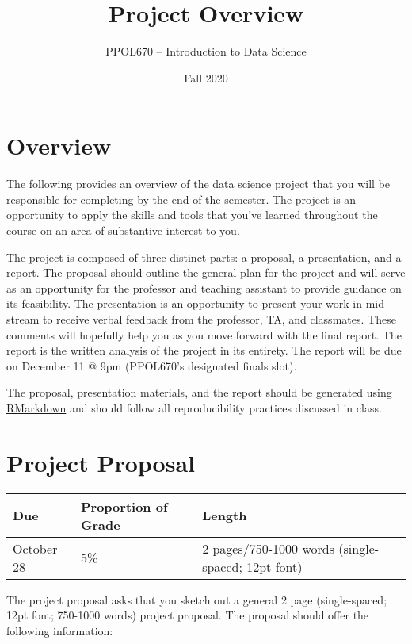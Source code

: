 \documentclass[
  12pt,
]{article}
\title{\textbf{Project Overview}}
\author{\Large PPOL670 -- Introduction to Data Science}
\date{Fall 2020}
\begin{document}
\maketitle

{
\setcounter{tocdepth}{3}
\tableofcontents
}
\hypertarget{overview}{%
\section{Overview}\label{overview}}

The following provides an overview of the data science project that you
will be responsible for completing by the end of the semester. The
project is an opportunity to apply the skills and tools that you've
learned throughout the course on an area of substantive interest to you.

The project is composed of three distinct parts: a proposal, a
presentation, and a report. The proposal should outline the general plan
for the project and will serve as an opportunity for the professor and
teaching assistant to provide guidance on its feasibility. The
presentation is an opportunity to present your work in mid-stream to
receive verbal feedback from the professor, TA, and classmates. These
comments will hopefully help you as you move forward with the final
report. The report is the written analysis of the project in its
entirety. The report will be due on December 11 @ 9pm (PPOL670's
designated finals slot).

The proposal, presentation materials, and the report should be generated
using
\href{https://rmarkdown.rstudio.com/authoring_quick_tour.html}{RMarkdown}
and should follow all reproducibility practices discussed in class.

\hypertarget{project-proposal}{%
\section{Project Proposal}\label{project-proposal}}

\begin{longtable}[]{@{}lll@{}}
\toprule
\textbf{Due} & \textbf{Proportion of Grade} &
\textbf{Length}\tabularnewline
\midrule
\endhead
October 28 & 5\% & 2 pages/750-1000 words (single-spaced; 12pt
font)\tabularnewline
\bottomrule
\end{longtable}

The project proposal asks that you sketch out a general 2 page
(single-spaced; 12pt font; 750-1000 words) project proposal. The
proposal should offer the following information:
\end{document}
